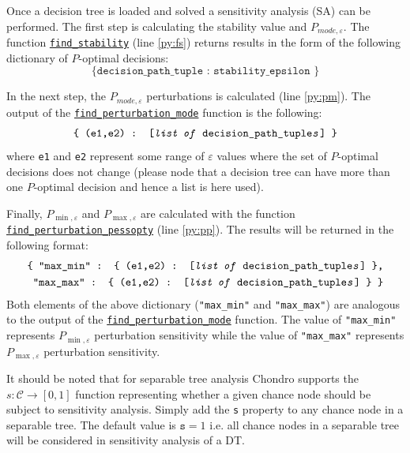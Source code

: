 \documentclass[a4paper,10pt,english]{sphinxmanual}
\begin{document}
	Once a decision tree is loaded and solved a sensitivity analysis (SA) can be performed. The first step is calculating the stability value and $P_{mode,\varepsilon}$. The function \hyperref[index:chondro.find_stability]{\texttt{find\_stability}} (line \ref{py:fs}) returns results in the form of the following dictionary of $P$-optimal decisions:
	\begin{equation*}
	\texttt{\{ decision\_path\_tuple : stability\_epsilon \} }
	\end{equation*}
	
	In the next step, the  $P_{mode,\varepsilon}$ perturbations is calculated (line \ref{py:pm}). The output of the \hyperref[index:chondro.find_perturbation_mode]{\texttt{find\_perturbation\_mode}} function is the following:
	\begin{equation*}
	\texttt{\{ (e1,e2) : [\textit{list of} decision\_path\_tuple\textit{s}] \}}
	\end{equation*}
	where \texttt{e1} and \texttt{e2} represent some range of $\varepsilon$ values where the set of $P$-optimal decisions does not change (please node that a decision tree can have more than one $P$-optimal decision and hence a list is here used).
	
	Finally, $P_{\min,\varepsilon}$ and $P_{\max,\varepsilon}$ are calculated with the function \hyperref[index:chondro.find_perturbation_pessopty]{\texttt{find\_perturbation\_pessopty}} (line \ref{py:pp}). The results will be returned in the following format:
	\begin{equation*}
	\begin{split}	
		\texttt{\{ }
		\texttt{"max\_min" : \{ (e1,e2) : [\textit{list of} decision\_path\_tuple\textit{s}] \},}\\
		\texttt{"max\_max" : \{ (e1,e2) : [\textit{list of} decision\_path\_tuple\textit{s}] \}}
		\texttt{ \}}				  
	\end{split}				
	\end{equation*}	
	Both elements of the above dictionary (\texttt{"max\_min"} and \texttt{"max\_max"}) are analogous to the output of the \hyperref[index:chondro.find_perturbation_mode]{\texttt{find\_perturbation\_mode}} function. The value of \texttt{"max\_min"} represents $P_{\min,\varepsilon}$ perturbation sensitivity while the value of \texttt{"max\_max"} represents $P_{\max,\varepsilon}$ perturbation sensitivity.


	It should be noted that for separable tree analysis Chondro supports the $s\colon\mathcal{C}\rightarrow[0,1]$ function representing whether a given chance node should be subject to sensitivity analysis. Simply add the \texttt{s} property to any chance node in a separable tree. The default value is $\texttt{s}=1$ i.e. all chance nodes in a separable tree will be considered in sensitivity analysis of a DT.
\end{document}
